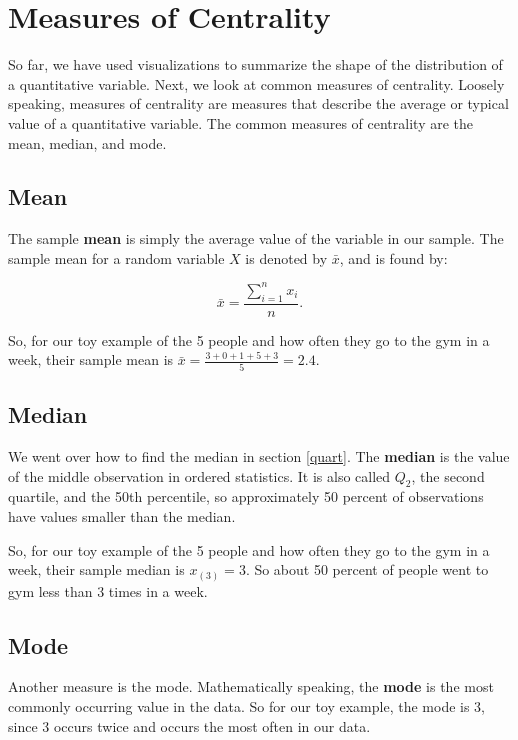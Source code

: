 \documentclass[
]{book}
\begin{document}
\section{Measures of Centrality}\label{measures-of-centrality}

So far, we have used visualizations to summarize the shape of the distribution of a quantitative variable. Next, we look at common measures of centrality. Loosely speaking, measures of centrality are measures that describe the average or typical value of a quantitative variable. The common measures of centrality are the mean, median, and mode.

\subsection{Mean}\label{mean}

The sample \textbf{mean} is simply the average value of the variable in our sample. The sample mean for a random variable \(X\) is denoted by \(\bar{x}\), and is found by:

\begin{equation} 
\bar{x} = \frac{\sum_{i=1}^n x_i}{n}.
\label{eq:mean}
\end{equation}

So, for our toy example of the 5 people and how often they go to the gym in a week, their sample mean is \(\bar{x} = \frac{3+0+1+5+3}{5} = 2.4\).

\subsection{Median}\label{median}

We went over how to find the median in section \ref{quart}. The \textbf{median} is the value of the middle observation in ordered statistics. It is also called \(Q_2\), the second quartile, and the 50th percentile, so approximately 50 percent of observations have values smaller than the median.

So, for our toy example of the 5 people and how often they go to the gym in a week, their sample median is \(x_{(3)} = 3\). So about 50 percent of people went to gym less than 3 times in a week.

\subsection{Mode}\label{mode}

Another measure is the mode. Mathematically speaking, the \textbf{mode} is the most commonly occurring value in the data. So for our toy example, the mode is 3, since 3 occurs twice and occurs the most often in our data.
\end{document}
